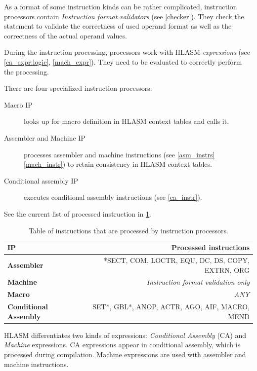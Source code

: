 As a format of some instruction kinds can be rather complicated, instruction processors contain \emph{Instruction format validators} (see \cref{checker}). They check the statement to validate the correctness of used operand format as well as the correctness of the actual operand values.

During the instruction processing, processors work with HLASM \emph{expressions} (see \cref{ca_expr:logic}, \cref{mach_expr}). They need to be evaluated to correctly perform the processing.

There are four specialized instruction processors:
\begin{description}
	\item[Macro IP] looks up for macro definition in HLASM context tables and calls it.
	\item[Assembler and Machine IP] processes assembler and machine instructions (see \cref{asm_instrs} \cref{mach_instr}) to retain consistency in HLASM context tables.
	\item[Conditional assembly IP] executes conditional assembly instructions (see \cref{ca_instr}). 
	
\end{description}

See the current list of processed instruction in \cref{tab06:instr_proc}.

\begin{table}
	\centering
	\begin{tabular}{lr}
		\textbf{IP}                   &                  \textbf{Processed instructions} \\ \toprule
		\textbf{Assembler}            & *SECT, COM, LOCTR, EQU, DC, DS, COPY, EXTRN, ORG \\
		\textbf{Machine}              &        \emph{Instruction format validation only} \\
		\textbf{Macro}                &                                       \emph{ANY} \\
		\textbf{Conditional Assembly} &    SET*, GBL*, ANOP, ACTR, AGO, AIF, MACRO, MEND \\ \bottomrule
	\end{tabular}
	\caption{Table of instructions that are processed by instruction processors.}
	\label{tab06:instr_proc}
\end{table}

\vspace{0.5cm}

HLASM differentiates two kinds of expressions: \emph{Conditional Assembly} (CA) and \emph{Machine} expressions. CA expressions appear in conditional assembly, which is processed during compilation. Machine expressions are used with assembler and machine instructions.

